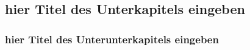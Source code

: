 \documentclass[a4paper,12pt,parskip,bibtotoc,liststotoc]{article}
\begin{document}
\subsection{hier Titel des Unterkapitels eingeben}
%


\subsubsection{hier Titel des Unterunterkapitels eingeben}
%






\end{document}
